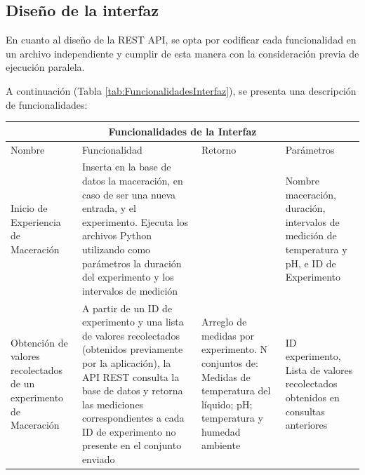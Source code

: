         \subsection{Diseño de la interfaz}
        \begin{minipage}{0.95\textwidth}
            \par En cuanto al diseño de la REST API, se opta por codificar cada funcionalidad en un archivo independiente y cumplir de esta manera con la consideración previa de ejecución paralela.
            \par A continuación (Tabla \ref{tab:FuncionalidadesInterfaz}), se presenta una descripción de funcionalidades:
            \\
            \end{minipage}
        \begin{minipage}{\textwidth}
            
                \centering
                \begin{tabularx}{\textwidth}{|X|X|X|X|}
                    \hline
                    \multicolumn{4}{|c|}{\textbf{Funcionalidades de la Interfaz}} \\
                    \hline
                    Nombre & Funcionalidad & Retorno & Parámetros \\ 
                    \hline 
                    \hline
                    
                    Inicio de Experiencia de Maceración & Inserta en la base de datos la maceración, en caso de ser una nueva entrada, y el experimento. Ejecuta los archivos Python utilizando como parámetros la duración del experimento y los intervalos de medición & & Nombre maceración,  duración, intervalos de medición de temperatura y pH, e ID de Experimento \\ 
                    \hline
                    Obtención de valores recolectados de un experimento de Maceración & A partir de un ID de experimento y una lista de valores recolectados (obtenidos previamente por la aplicación), la API REST consulta la base de datos y retorna las mediciones correspondientes a cada ID de experimento no presente en el conjunto enviado & Arreglo de medidas por experimento. N conjuntos de: Medidas de temperatura del líquido; pH; temperatura y humedad ambiente & ID experimento, Lista de valores recolectados obtenidos en consultas anteriores \\ 
                    \hline
                    
              
                \end{tabularx}
                \label{tab:FuncionalidadesInterfaz}
            
            \end{minipage}
            
